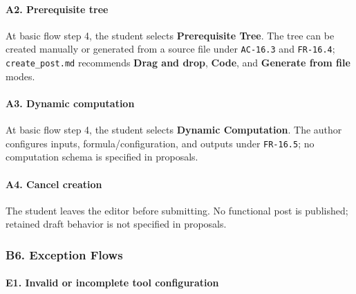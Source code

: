\documentclass[12pt]{article}
\begin{document}
\hypertarget{sec:a2-prerequisite-tree}{}
\paragraph*{A2. Prerequisite tree}
\par\medskip

At basic flow step 4, the student selects \textbf{Prerequisite Tree}. The tree can be created manually or generated from a source file under \texttt{AC-16.3} and \texttt{FR-16.4}; \texttt{create\_post.md} recommends \textbf{Drag and drop}, \textbf{Code}, and \textbf{Generate from file} modes.
\par\medskip

\hypertarget{sec:a3-dynamic-computation}{}
\paragraph*{A3. Dynamic computation}
\par\medskip

At basic flow step 4, the student selects \textbf{Dynamic Computation}. The author configures inputs, formula/configuration, and outputs under \texttt{FR-16.5}; no computation schema is specified in proposals.
\par\medskip

\hypertarget{sec:a4-cancel-creation}{}
\paragraph*{A4. Cancel creation}
\par\medskip

The student leaves the editor before submitting. No functional post is published; retained draft behavior is not specified in proposals.
\par\medskip

\hypertarget{sec:b6-exception-flows}{}
\subsubsection*{B6. Exception Flows}
\par\medskip

\hypertarget{sec:e1-invalid-or-incomplete-tool-configuration}{}
\paragraph*{E1. Invalid or incomplete tool configuration}
\par\medskip
\end{document}
